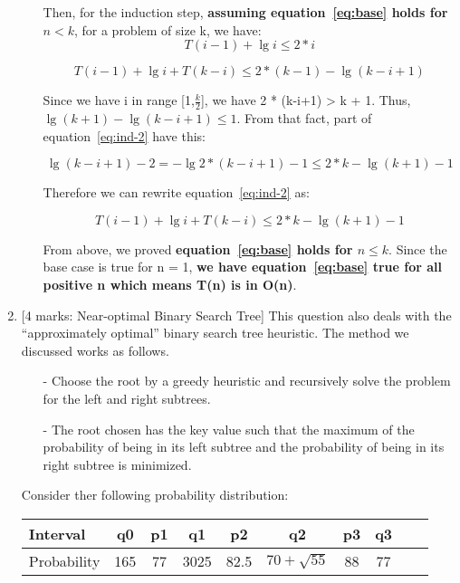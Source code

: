 \documentclass[12pt]{article}
\begin{document}
\begin{enumerate}
\begin{itemize}
Then, for the induction step, \textbf{assuming equation~\ref{eq:base} holds for $n < k$}, for a problem of size k, we have:
\begin{equation} \label{eq:ind-1}
T(i-1) + \lg{i} \leq 2 * i
\end{equation}

\begin{equation} \label{eq:ind-2}
T(i-1) + \lg{i} + T{(k-i)} \leq 2 * (k-1) - \lg{(k-i+1)}
\end{equation}

Since we have i in range [1,$\frac{k}{2}$], we have 2 * (k-i+1) > k + 1. Thus, $ \lg{(k+1)} - \lg{(k-i+1)} \leq 1 $. From that fact, part of equation~\ref{eq:ind-2} have this:

\begin{equation} \label{eq:ind-3}
\lg{(k-i+1)} -2 = - \lg{2 * (k-i+1)} - 1 \leq 2 * k - \lg{(k+1)} - 1
\end{equation}

Therefore we can rewrite equation~\ref{eq:ind-2} as:

\begin{equation} \label{eq:ind-3}
T(i-1) + \lg{i} + T{(k-i)} \leq 2 * k - \lg{(k+1)} - 1
\end{equation}

From above, we proved \textbf{equation~\ref{eq:base} holds for $n \leq k$}. Since the base case is true for n = 1, \textbf{we have equation~\ref{eq:base} true for all positive n which means T(n) is in O(n)}.

\end{itemize}

\medskip

\item{} [4 marks: Near-optimal Binary Search Tree]
This question also deals with the “approximately optimal” binary search tree heuristic. The method we discussed works as follows.

\begin{itemize}
\item[-] Choose the root by a greedy heuristic and recursively solve the problem for the left and right subtrees.
\item[-] The root chosen has the key value such that the maximum of the probability of being in its left subtree and the probability of being in its right subtree is minimized.
\end{itemize}

Consider ther following probability distribution:
\begin{center}
\begin{tabular}{l*{8}{c}r}
Interval          & q0 & p1 & q1 & p2 & q2 & p3 & q3                                         \\
\hline
Probability     & 165 & 77 & 3025 & 82.5 & $70 + \sqrt{55}$ & 88 & 77               \\
\end{tabular}
\end{center}


\end{enumerate}
\end{document}
